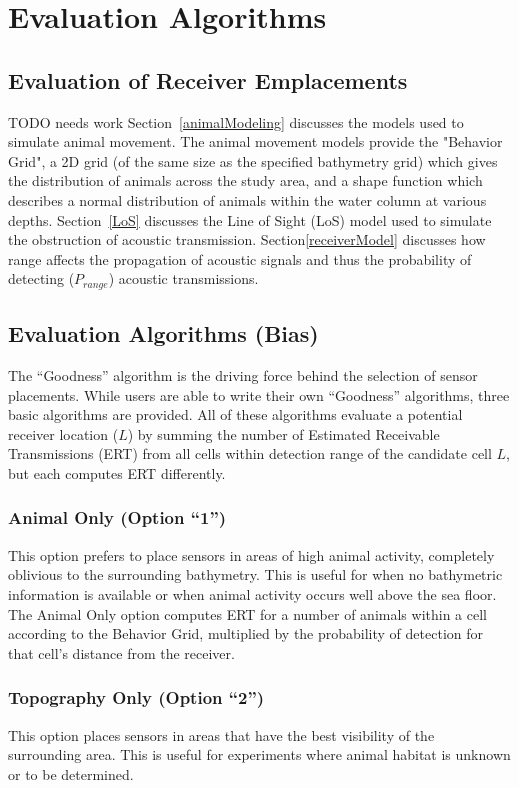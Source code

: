 \section{Evaluation Algorithms}
\label{evaluationAlgorithms}

\subsection{Evaluation of Receiver Emplacements} TODO needs work
\label{evaluationOfReceiver}
Section~\ref{animalModeling} discusses the models used to simulate animal movement.  The animal movement models provide the "Behavior Grid", a 2D grid (of the same size as the specified bathymetry grid) which gives the distribution of animals across the study area, and a shape function which describes a normal distribution of animals within the water column at various depths.  Section~\ref{LoS} discusses the Line of Sight (LoS) model used to simulate the obstruction of acoustic transmission.  Section\ref{receiverModel} discusses how range affects the propagation of acoustic signals and thus the probability of detecting ($P_{range}$) acoustic transmissions.

\subsection{Evaluation Algorithms (Bias)}
The “Goodness” algorithm is the driving force behind the selection of sensor placements.  While users are able to write their own “Goodness” algorithms, three basic algorithms are provided.  All of these algorithms evaluate a potential receiver location ($L$) by summing the number of Estimated Receivable Transmissions (ERT) from all cells within detection range of the candidate cell $L$, but each computes ERT differently.

\subsubsection{Animal Only (Option “1”)}
This option prefers to place sensors in areas of high animal activity, completely oblivious to the surrounding bathymetry.  This is useful for when no bathymetric information is available or when animal activity occurs well above the sea floor.   The Animal Only option computes ERT for a number of animals within a cell according to the Behavior Grid, multiplied by the probability of detection for that cell's distance from the receiver.

\subsubsection{Topography Only (Option “2”)}
This option places sensors in areas that have the best visibility of the surrounding area.  This is useful for experiments where animal habitat is unknown or to be determined.

